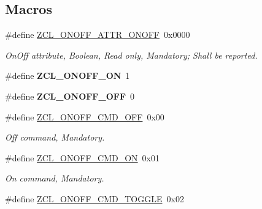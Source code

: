 \subsection*{Macros}
\begin{DoxyCompactItemize}
\item 
\hypertarget{group__zcl__onoff_gacead5607fb8cc864c55906e350a64bd1}{\#define \hyperlink{group__zcl__onoff_gacead5607fb8cc864c55906e350a64bd1}{Z\-C\-L\-\_\-\-O\-N\-O\-F\-F\-\_\-\-A\-T\-T\-R\-\_\-\-O\-N\-O\-F\-F}~0x0000}\label{group__zcl__onoff_gacead5607fb8cc864c55906e350a64bd1}

\begin{DoxyCompactList}\small\item\em On\-Off attribute, Boolean, Read only, Mandatory; Shall be reported. \end{DoxyCompactList}\item 
\hypertarget{group__zcl__onoff_gaecb7161f8e345f46eb152712ad013076}{\#define {\bfseries Z\-C\-L\-\_\-\-O\-N\-O\-F\-F\-\_\-\-O\-N}~1}\label{group__zcl__onoff_gaecb7161f8e345f46eb152712ad013076}

\item 
\hypertarget{group__zcl__onoff_gafb283aacc97d39a5dce2e5f43861794c}{\#define {\bfseries Z\-C\-L\-\_\-\-O\-N\-O\-F\-F\-\_\-\-O\-F\-F}~0}\label{group__zcl__onoff_gafb283aacc97d39a5dce2e5f43861794c}

\item 
\hypertarget{group__zcl__onoff_gae399574a77084fc410cbd12cd30ff10d}{\#define \hyperlink{group__zcl__onoff_gae399574a77084fc410cbd12cd30ff10d}{Z\-C\-L\-\_\-\-O\-N\-O\-F\-F\-\_\-\-C\-M\-D\-\_\-\-O\-F\-F}~0x00}\label{group__zcl__onoff_gae399574a77084fc410cbd12cd30ff10d}

\begin{DoxyCompactList}\small\item\em Off command, Mandatory. \end{DoxyCompactList}\item 
\hypertarget{group__zcl__onoff_gab3ebd17876bb8a4ac892665a7093cd22}{\#define \hyperlink{group__zcl__onoff_gab3ebd17876bb8a4ac892665a7093cd22}{Z\-C\-L\-\_\-\-O\-N\-O\-F\-F\-\_\-\-C\-M\-D\-\_\-\-O\-N}~0x01}\label{group__zcl__onoff_gab3ebd17876bb8a4ac892665a7093cd22}

\begin{DoxyCompactList}\small\item\em On command, Mandatory. \end{DoxyCompactList}\item 
\hypertarget{group__zcl__onoff_ga03727593ce0b9deea2e9c6c24077a27c}{\#define \hyperlink{group__zcl__onoff_ga03727593ce0b9deea2e9c6c24077a27c}{Z\-C\-L\-\_\-\-O\-N\-O\-F\-F\-\_\-\-C\-M\-D\-\_\-\-T\-O\-G\-G\-L\-E}~0x02}\label{group__zcl__onoff_ga03727593ce0b9deea2e9c6c24077a27c}


\end{DoxyCompactItemize}
